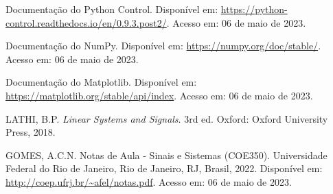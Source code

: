 \documentclass[10pt]{article}
\begin{document}
\newpage

\begin{thebibliography}{99}
     Documentação do Python Control. Disponível em: \url{https://python-control.readthedocs.io/en/0.9.3.post2/}. Acesso em: 06 de maio de 2023.
    
     Documentação do NumPy. Disponível em: \url{https://numpy.org/doc/stable/}. Acesso em: 06 de maio de 2023.
    
     Documentação do Matplotlib. Disponível em: \url{https://matplotlib.org/stable/api/index}. Acesso em: 06 de maio de 2023.

     LATHI, B.P. \textit{Linear Systems and Signals}. 3rd ed. Oxford: Oxford University Press, 2018.

     GOMES, A.C.N. Notas de Aula - Sinais e Sistemas (COE350). Universidade Federal do Rio de Janeiro, Rio de Janeiro, RJ, Brasil, 2022. Disponível em: \url{http://coep.ufrj.br/~afel/notas.pdf}. Acesso em: 06 de maio de 2023.
\end{thebibliography}
\end{document}
